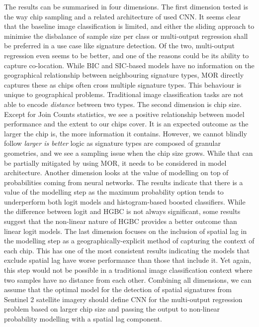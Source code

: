 The results can be summarised in four dimensions.
The first dimension tested is the way chip sampling and a related architecture of used
CNN. It seems clear that the baseline image classification is limited, and either the
sliding approach to minimise the disbalance of sample size per class or multi-output
regression shall be preferred in a use case like signature detection. Of the two,
multi-output regression even seems to be better, and one of the reasons could be its
ability to capture co-location. While BIC and SIC-based models have no information on
the geographical relationship between neighbouring signature types, MOR directly
captures these as chips often cross multiple signature types. This behaviour is unique
to geographical problems. Traditional image classification tasks are not able to encode
\textit{distance} between two types.
The second dimension is chip size. Except for Join Counts statistics, we see a positive
relationship between model performance and the extent to our chips cover. It is an expected
outcome as the larger the chip is, the more information it contains. However, we cannot
blindly follow \textit{larger is better} logic as signature types are composed of
granular geometries, and we see a sampling issue when the chip size grows. While that
can be partially mitigated by using MOR, it needs to be considered in model
architecture.
Another dimension looks at the value of modelling on top of probabilities coming from
neural networks. The results indicate that there is a value of the modelling step as the
maximum probability option tends to underperform both logit models and histogram-based
boosted classifiers. While the difference between logit and HGBC is not always
significant, some results suggest that the non-linear nature of HGBC provides a better
outcome than linear logit models.
The last dimension focuses on the inclusion of spatial lag in the modelling step as a
geographically-explicit method of capturing the context of each chip. This has one of
the most consistent results indicating the models that exclude spatial lag have worse
performance than those that include it. Yet again, this step would not be possible in a
traditional image classification context where two samples have no distance from each
other.
Combining all dimensions, we can assume that the optimal model for the detection of spatial
signatures from Sentinel 2 satellite imagery should define CNN for the multi-output
regression problem based on larger chip size and passing the output to non-linear
probability modelling with a spatial lag component.

